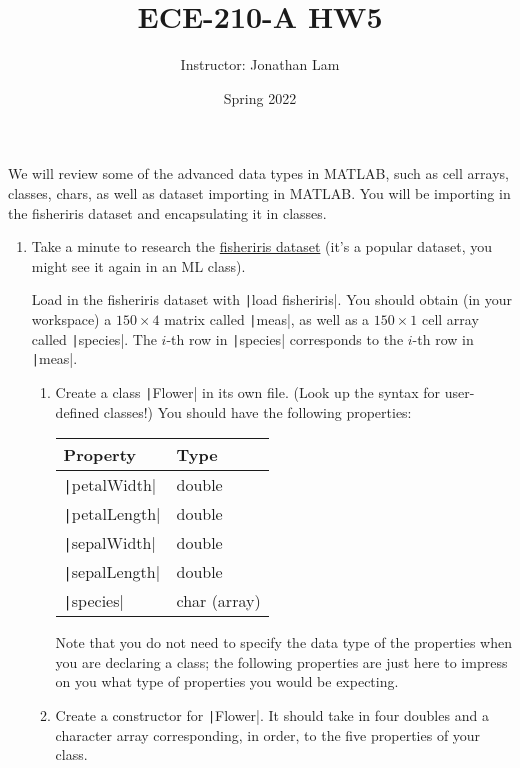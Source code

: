 \documentclass{article}
\title{ECE-210-A HW5}
\author{Instructor: Jonathan Lam}
\date{Spring 2022}
\begin{document}
\maketitle

\noindent We will review some of the advanced data types in MATLAB, such as cell arrays, classes, chars, as well as dataset importing in MATLAB. You will be importing in the fisheriris dataset and encapsulating it in classes.

\begin{enumerate}
\item Take a minute to research the \href{https://en.wikipedia.org/wiki/Iris_flower_data_set}{fisheriris dataset} (it's a popular dataset, you might see it again in an ML class).

  Load in the fisheriris dataset with \texttt|load fisheriris|. You should obtain (in your workspace) a $150\times 4$ matrix called \texttt|meas|, as well as a $150\times 1$ cell array called \texttt|species|. The $i$-th row in \texttt|species| corresponds to the $i$-th row in \texttt|meas|.

  \begin{enumerate}
  \item Create a class \texttt|Flower| in its own file. (Look up the syntax for user-defined classes!) You should have the following properties:
    \begin{table}[h]
      \centering
      \begin{tabular}{l|l}
        Property                & Type   \\ \hline
        \texttt|petalWidth|  & double \\
        \texttt|petalLength| & double \\
        \texttt|sepalWidth|  & double \\
        \texttt|sepalLength| & double \\
        \texttt|species|     & char (array)
      \end{tabular}
    \end{table}

    Note that you do not need to specify the data type of the properties when you are declaring a class; the following properties are just here to impress on you what type of properties you would be expecting.

  \item Create a constructor for \texttt|Flower|. It should take in four doubles and a character array corresponding, in order, to the five properties of your class.


\end{enumerate}
\end{enumerate}
\end{document}
